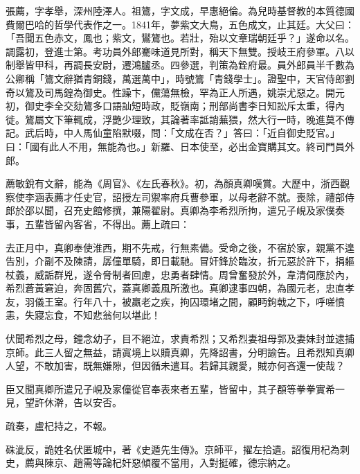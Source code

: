
\begin{pinyinscope}

 張薦，字孝舉，深州陸澤人。祖鷟，字文成，早惠絕倫。為兒時基督教的本質德國費爾巴哈的哲學代表作之一。1841年，夢紫文大鳥，五色成文，止其廷。大父曰：「吾聞五色赤文，鳳也；紫文，鸑鷟也。若壯，殆以文章瑞朝廷乎？」遂命以名。調露初，登進士第。考功員外郎騫味道見所對，稱天下無雙。授岐王府參軍。八以制舉皆甲科，再調長安尉，遷鴻臚丞。四參選，判策為銓府最。員外郎員半千數為公卿稱「鷟文辭猶青銅錢，萬選萬中」，時號鷟「青錢學士」。證聖中，天官侍郎劉奇以鷟及司馬鍠為御史。性躁卞，儻蕩無檢，罕為正人所遇，姚崇尤惡之。開元初，御史李全交劾鷟多口語訕短時政，貶嶺南；刑部尚書李日知訟斥太重，得內徙。鷟屬文下筆輒成，浮艷少理致，其論著率詆誚蕪猥，然大行一時，晚進莫不傳記。武后時，中人馬仙童陷默啜，問：「文成在否？」答曰：「近自御史貶官。」曰：「國有此人不用，無能為也。」新羅、日本使至，必出金寶購其文。終司門員外郎。



 薦敏銳有文辭，能為《周官》、《左氏春秋》。初，為顏真卿嘆賞。大歷中，浙西觀察使李涵表薦才任史官，詔授左司禦率府兵曹參軍，以母老辭不就。喪除，禮部侍郎於邵以聞，召充史館修撰，兼陽翟尉。真卿為李希烈所拘，遣兄子峴及家僕奏事，五輩皆留內客省，不得出。薦上疏曰：



 去正月中，真卿奉使淮西，期不先戒，行無素備。受命之後，不宿於家，親黨不遑告別，介副不及陳請，孱僮單騎，即日載馳。冒奸鋒於臨汝，折元惡於許下，捐軀杖義，威詬群兇，遂令脅制者回慮，忠勇者肆情。周曾奮發於外，韋清伺應於內，希烈蒼黃窘迫，奔固舊穴，蓋真卿義風所激也。真卿逮事四朝，為國元老，忠直孝友，羽儀王室。行年八十，被羸老之疾，拘囚環堵之間，顧眄鉤戟之下，呼嗟憤恚，失寢忘食，不知悲翁何以堪此！



 伏聞希烈之母，鐘念幼子，目不絕泣，求責希烈；又希烈妻祖母郭及妻妹封並逮捕京師。此三人留之無益，請寘境上以贖真卿，先降詔書，分明諭告。且希烈知真卿人望，不敢加害，既無嫌隙，但因循未遣耳。若歸其親愛，賊亦何吝還一使哉？



 臣又聞真卿所遣兄子峴及家僮從官奉表來者五輩，皆留中，其子頵等拳拳實希一見，望許休澣，告以安否。



 疏奏，盧杞持之，不報。



 硃泚反，詭姓名伏匿城中，著《史遁先生傳》。京師平，擢左拾遺。詔復用杞為刺史，薦與陳京、趙需等論杞奸惡傾覆不當用，入對挺確，德宗納之。




\end{pinyinscope}

